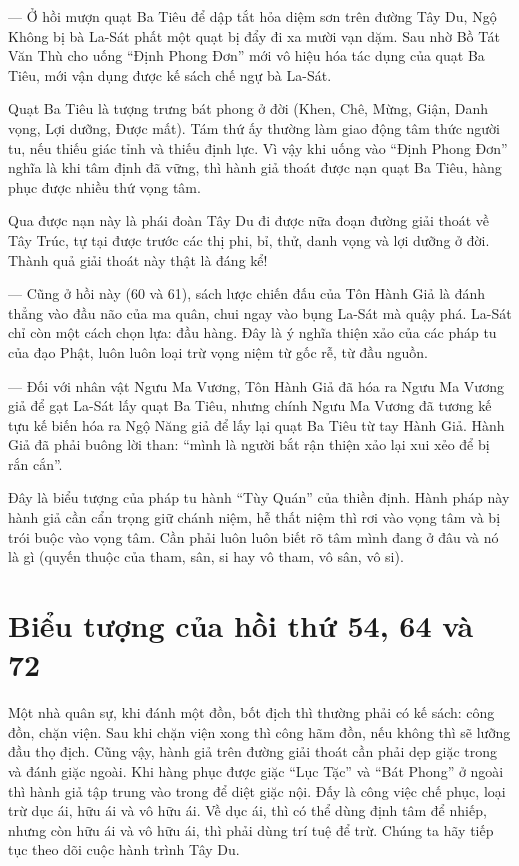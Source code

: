— Ở hồi mượn quạt Ba Tiêu để dập tắt hỏa diệm sơn trên đường Tây Du, Ngộ Không bị bà La-Sát phất một quạt bị đẩy đi xa mười vạn dặm. Sau nhờ Bồ Tát Văn Thù cho uống ``Định Phong Đơn'' mới vô hiệu hóa tác dụng của quạt Ba Tiêu, mới vận dụng được kế sách chế ngự bà La-Sát.

Quạt Ba Tiêu là tượng trưng bát phong ở đời (Khen, Chê, Mừng, Giận, Danh vọng, Lợi dưỡng, Được mất). Tám thứ ấy thường làm giao động tâm thức người tu, nếu thiếu giác tỉnh và thiếu định lực. Vì vậy khi uống vào ``Định Phong Đơn'' nghĩa là khi tâm định đã vững, thì hành giả thoát được nạn quạt Ba Tiêu, hàng phục được nhiều thứ vọng tâm.

Qua được nạn này là phái đoàn Tây Du đi được nữa đoạn đường giải thoát về Tây Trúc, tự tại được trước các thị phi, bỉ, thử, danh vọng và lợi dưỡng ở đời. Thành quả giải thoát này thật là đáng kể!

— Cũng ở hồi này (60 và 61), sách lược chiến đấu của Tôn Hành Giả là đánh thẳng vào đầu não của ma quân, chui ngay vào bụng La-Sát mà quậy phá. La-Sát chỉ còn một cách chọn lựa: đầu hàng. Đây là ý nghĩa thiện xảo của các pháp tu của đạo Phật, luôn luôn loại trừ vọng niệm từ gốc rễ, từ đầu nguồn.

— Đối với nhân vật Ngưu Ma Vương, Tôn Hành Giả đã hóa ra Ngưu Ma Vương giả để gạt La-Sát lấy quạt Ba Tiêu, nhưng chính Ngưu Ma Vương đã tương kế tựu kế biến hóa ra Ngộ Năng giả để lấy lại quạt Ba Tiêu từ tay Hành Giả. Hành Giả đã phải buông lời than: ``mình là người bắt rận thiện xảo lại xui xẻo để bị rắn cắn''.

Đây là biểu tượng của pháp tu hành ``Tùy Quán'' của thiền định. Hành pháp này hành giả cần cẩn trọng giữ chánh niệm, hễ thất niệm thì rơi vào vọng tâm và bị trói buộc vào vọng tâm. Cần phải luôn luôn biết rõ tâm mình đang ở đâu và nó là gì (quyến thuộc của tham, sân, si hay vô tham, vô sân, vô si).

\section{Biểu tượng của hồi thứ 54, 64 và 72} %
\label{sec:bieu_tuong_hoi_54_64_và_72}

Một nhà quân sự, khi đánh một đồn, bốt địch thì thường phải có kế sách: công đồn, chặn viện. Sau khi chặn viện xong thì công hãm đồn, nếu không thì sẽ lưỡng đầu thọ địch. Cũng vậy, hành giả trên đường giải thoát cần phải dẹp giặc trong và đánh giặc ngoài. Khi hàng phục được giặc ``Lục Tặc'' và ``Bát Phong'' ở ngoài thì hành giả tập trung vào trong để diệt giặc nội. Đấy là công việc chế phục, loại trừ dục ái, hữu ái và vô hữu ái. Về dục ái, thì có thể dùng định tâm để nhiếp, nhưng còn hữu ái và vô hữu ái, thì phải dùng trí tuệ để trừ. Chúng ta hãy tiếp tục theo dõi cuộc hành trình Tây Du.

